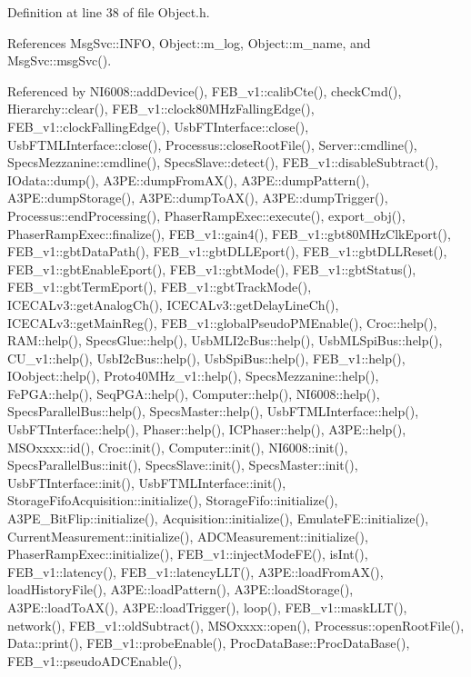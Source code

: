 Definition at line 38 of file Object.\+h.



References Msg\+Svc\+::\+I\+N\+FO, Object\+::m\+\_\+log, Object\+::m\+\_\+name, and Msg\+Svc\+::msg\+Svc().



Referenced by N\+I6008\+::add\+Device(), F\+E\+B\+\_\+v1\+::calib\+Cte(), check\+Cmd(), Hierarchy\+::clear(), F\+E\+B\+\_\+v1\+::clock80\+M\+Hz\+Falling\+Edge(), F\+E\+B\+\_\+v1\+::clock\+Falling\+Edge(), Usb\+F\+T\+Interface\+::close(), Usb\+F\+T\+M\+L\+Interface\+::close(), Processus\+::close\+Root\+File(), Server\+::cmdline(), Specs\+Mezzanine\+::cmdline(), Specs\+Slave\+::detect(), F\+E\+B\+\_\+v1\+::disable\+Subtract(), I\+Odata\+::dump(), A3\+P\+E\+::dump\+From\+A\+X(), A3\+P\+E\+::dump\+Pattern(), A3\+P\+E\+::dump\+Storage(), A3\+P\+E\+::dump\+To\+A\+X(), A3\+P\+E\+::dump\+Trigger(), Processus\+::end\+Processing(), Phaser\+Ramp\+Exec\+::execute(), export\+\_\+obj(), Phaser\+Ramp\+Exec\+::finalize(), F\+E\+B\+\_\+v1\+::gain4(), F\+E\+B\+\_\+v1\+::gbt80\+M\+Hz\+Clk\+Eport(), F\+E\+B\+\_\+v1\+::gbt\+Data\+Path(), F\+E\+B\+\_\+v1\+::gbt\+D\+L\+L\+Eport(), F\+E\+B\+\_\+v1\+::gbt\+D\+L\+L\+Reset(), F\+E\+B\+\_\+v1\+::gbt\+Enable\+Eport(), F\+E\+B\+\_\+v1\+::gbt\+Mode(), F\+E\+B\+\_\+v1\+::gbt\+Status(), F\+E\+B\+\_\+v1\+::gbt\+Term\+Eport(), F\+E\+B\+\_\+v1\+::gbt\+Track\+Mode(), I\+C\+E\+C\+A\+Lv3\+::get\+Analog\+Ch(), I\+C\+E\+C\+A\+Lv3\+::get\+Delay\+Line\+Ch(), I\+C\+E\+C\+A\+Lv3\+::get\+Main\+Reg(), F\+E\+B\+\_\+v1\+::global\+Pseudo\+P\+M\+Enable(), Croc\+::help(), R\+A\+M\+::help(), Specs\+Glue\+::help(), Usb\+M\+L\+I2c\+Bus\+::help(), Usb\+M\+L\+Spi\+Bus\+::help(), C\+U\+\_\+v1\+::help(), Usb\+I2c\+Bus\+::help(), Usb\+Spi\+Bus\+::help(), F\+E\+B\+\_\+v1\+::help(), I\+Oobject\+::help(), Proto40\+M\+Hz\+\_\+v1\+::help(), Specs\+Mezzanine\+::help(), Fe\+P\+G\+A\+::help(), Seq\+P\+G\+A\+::help(), Computer\+::help(), N\+I6008\+::help(), Specs\+Parallel\+Bus\+::help(), Specs\+Master\+::help(), Usb\+F\+T\+M\+L\+Interface\+::help(), Usb\+F\+T\+Interface\+::help(), Phaser\+::help(), I\+C\+Phaser\+::help(), A3\+P\+E\+::help(), M\+S\+Oxxxx\+::id(), Croc\+::init(), Computer\+::init(), N\+I6008\+::init(), Specs\+Parallel\+Bus\+::init(), Specs\+Slave\+::init(), Specs\+Master\+::init(), Usb\+F\+T\+Interface\+::init(), Usb\+F\+T\+M\+L\+Interface\+::init(), Storage\+Fifo\+Acquisition\+::initialize(), Storage\+Fifo\+::initialize(), A3\+P\+E\+\_\+\+Bit\+Flip\+::initialize(), Acquisition\+::initialize(), Emulate\+F\+E\+::initialize(), Current\+Measurement\+::initialize(), A\+D\+C\+Measurement\+::initialize(), Phaser\+Ramp\+Exec\+::initialize(), F\+E\+B\+\_\+v1\+::inject\+Mode\+F\+E(), is\+Int(), F\+E\+B\+\_\+v1\+::latency(), F\+E\+B\+\_\+v1\+::latency\+L\+L\+T(), A3\+P\+E\+::load\+From\+A\+X(), load\+History\+File(), A3\+P\+E\+::load\+Pattern(), A3\+P\+E\+::load\+Storage(), A3\+P\+E\+::load\+To\+A\+X(), A3\+P\+E\+::load\+Trigger(), loop(), F\+E\+B\+\_\+v1\+::mask\+L\+L\+T(), network(), F\+E\+B\+\_\+v1\+::old\+Subtract(), M\+S\+Oxxxx\+::open(), Processus\+::open\+Root\+File(), Data\+::print(), F\+E\+B\+\_\+v1\+::probe\+Enable(), Proc\+Data\+Base\+::\+Proc\+Data\+Base(), F\+E\+B\+\_\+v1\+::pseudo\+A\+D\+C\+Enable(), 